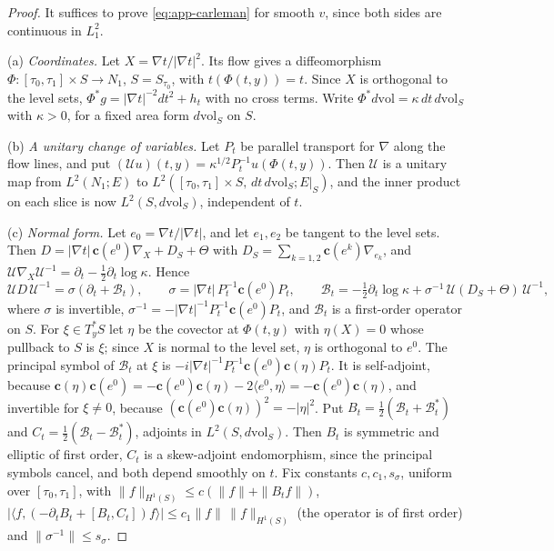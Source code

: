 \documentclass[11pt]{amsart}
\theoremstyle{definition}
\theoremstyle{remark}
\theoremstyle{plain}
\numberwithin{equation}{section}
\begin{document}
\begin{proof}
It suffices to prove \eqref{eq:app-carleman} for smooth $v$, since both sides are continuous in
$L^2_1$.

(a) \emph{Coordinates.} Let $X=\nabla t/|\nabla t|^2$. Its flow gives a diffeomorphism
$\Phi\colon[\tau_0,\tau_1]\times S\to N_1$, $S=S_{\tau_0}$, with $t(\Phi(t,y))=t$. Since $X$ is
orthogonal to the level sets, $\Phi^*g=|\nabla t|^{-2}dt^2+h_t$ with no cross terms. Write
$\Phi^*d\mathrm{vol}=\kappa\,dt\,d\mathrm{vol}_S$ with $\kappa>0$, for a fixed area form
$d\mathrm{vol}_S$ on $S$.

(b) \emph{A unitary change of variables.} Let $P_t$ be parallel transport for $\nabla$ along the
flow lines, and put $(\mathcal Uu)(t,y)=\kappa^{1/2}P_t^{-1}u(\Phi(t,y))$. Then $\mathcal U$ is a
unitary map from $L^2(N_1;E)$ to $L^2([\tau_0,\tau_1]\times S,\,dt\,d\mathrm{vol}_S;E|_S)$, and
the inner product on each slice is now $L^2(S,d\mathrm{vol}_S)$, independent of $t$.

(c) \emph{Normal form.} Let $e_0=\nabla t/|\nabla t|$, and let $e_1,e_2$ be tangent to the level
sets. Then $D=|\nabla t|\,\mathbf c(e^0)\nabla_X+D_S+\Theta$ with
$D_S=\sum_{k=1,2}\mathbf c(e^k)\nabla_{e_k}$, and $\mathcal U\nabla_X\mathcal U^{-1}=\partial_t
-\tfrac12\partial_t\log\kappa$. Hence
\[
\mathcal UD\,\mathcal U^{-1}=\sigma(\partial_t+\mathcal B_t),\qquad
\sigma=|\nabla t|\,P_t^{-1}\mathbf c(e^0)P_t,\qquad
\mathcal B_t=-\tfrac12\partial_t\log\kappa+\sigma^{-1}\,\mathcal U(D_S+\Theta)\,\mathcal U^{-1},
\]
where $\sigma$ is invertible, $\sigma^{-1}=-|\nabla t|^{-1}P_t^{-1}\mathbf c(e^0)P_t$, and
$\mathcal B_t$ is a first-order operator on $S$. For $\xi\in T^*_yS$ let $\eta$ be the covector at
$\Phi(t,y)$ with $\eta(X)=0$ whose pullback to $S$ is $\xi$; since $X$ is normal to the level
set, $\eta$ is orthogonal to $e^0$. The principal symbol of $\mathcal B_t$ at $\xi$ is
$-i|\nabla t|^{-1}P_t^{-1}\mathbf c(e^0)\mathbf c(\eta)P_t$. It is self-adjoint, because
$\mathbf c(\eta)\mathbf c(e^0)=-\mathbf c(e^0)\mathbf c(\eta)-2\langle e^0,\eta\rangle
=-\mathbf c(e^0)\mathbf c(\eta)$, and invertible for $\xi\ne0$, because
$(\mathbf c(e^0)\mathbf c(\eta))^2=-|\eta|^2$. Put $B_t=\tfrac12(\mathcal B_t+\mathcal B_t^*)$ and
$C_t=\tfrac12(\mathcal B_t-\mathcal B_t^*)$, adjoints in $L^2(S,d\mathrm{vol}_S)$. Then $B_t$ is
symmetric and elliptic of first order, $C_t$ is a skew-adjoint endomorphism, since the
principal symbols cancel, and both depend smoothly on $t$. Fix constants $c,c_1,s_\sigma$,
uniform over $[\tau_0,\tau_1]$, with $\|f\|_{H^1(S)}\le c(\|f\|+\|B_tf\|)$,
$|\langle f,(-\partial_tB_t+[B_t,C_t])f\rangle|\le c_1\|f\|\,\|f\|_{H^1(S)}$ (the operator is of
first order) and $\|\sigma^{-1}\|\le s_\sigma$.


\end{proof}
\end{document}
